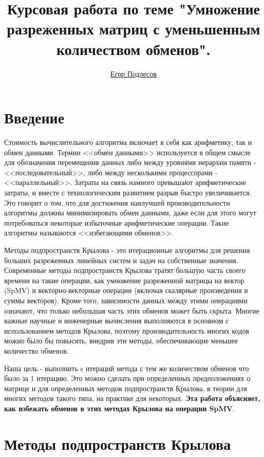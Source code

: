 \documentclass[a4paper,12pt]{report}
\author{\href{https://github.com/ypodlesov}{Егор Подлесов}}
\title{\textbf{Курсовая работа по теме "Умножение разреженных матриц с уменьшенным количеством обменов".}}
\begin{document}
    \maketitle
    \clearpage
    \tableofcontents

    \chapter{ Введение }

    Стоимость вычислительного алгоритма включает в себя как арифметику, так и обмен данными. Термин <<обмен данными>> используется в общем смысле для обозначения перемещения данных либо между уровнями иерархии памяти - <<последовательный>>, либо между несколькими процессорами - <<параллельный>>. Затраты на связь намного превышают арифметические затраты, и вместе с технологическим развитием разрыв быстро увеличивается. Это говорит о том, что для достижения наилучшей производительности алгоритмы должны минимизировать обмен данными, даже если для этого могут потребоваться некоторые избыточные арифметические операции. Такие алгоритмы называются <<избегающими обменов>>.

    Методы подпространств Крылова - это итерационные алгоритмы для решения больших разреженных линейных систем и задач на собственные значения. Современные методы подпространств Крылова тратят большую часть своего времени на такие операции, как умножение разреженной матрицы на вектор (SpMV) и векторно-векторные операции (включая скалярные произведения и суммы векторов). Кроме того, зависимости данных между этими операциями означают, что только небольшая часть этих обменов может быть скрыта. Многие важные научные и инженерные вычисления выполняются в основном с использованием методов Крылова, поэтому производительность многих кодов можно было бы повысить, внедрив эти методы, обеспечивающие меньшее количество обменов.

    Наша цель - выполнить s итераций метода с тем же количеством обменов что было за 1 итерацию. Это можно сделать при определенных предположениях о матрице и для определенных методов подпространств Крылова, в теории для многих методов такого типа, на практике для некоторых. \textbf{Эта работа объясняет, как избежать обменов в этих методах Крылова на операции SpMV}.

    \chapter{ Методы подпространств Крылова }
    
\end{document}
